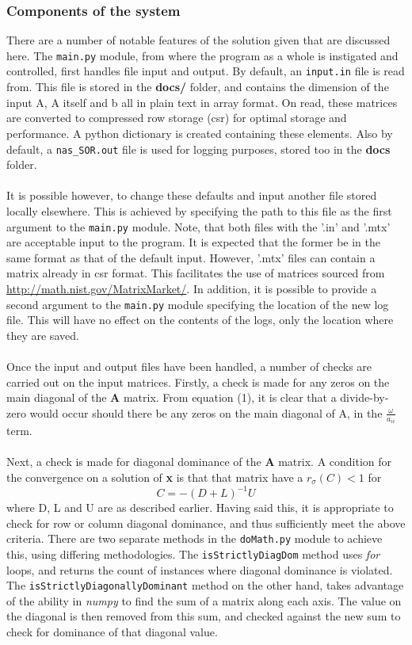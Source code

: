 \documentclass[paper=a4, fontsize=10pt]{article} %
\begin{document}
{\subsubsection{Components of the system}
{There are a number of notable features of the solution given that are discussed here. The \texttt{main.py} module, from where the program as a whole is instigated and controlled, first handles file input and output. By default, an \texttt{input.in} file is read from. This file is stored in the {\bf docs/} folder, and contains the dimension of the input A, A itself and b all in plain text in array format. On read, these matrices are converted to compressed row storage (csr) for optimal storage and performance. A python dictionary is created containing these elements. Also by default, a \texttt{nas\_SOR.out} file is used for logging purposes, stored too in the {\bf docs} folder. \\\\
It is possible however, to change these defaults and input another file stored locally elsewhere. This is achieved by specifying the path to this file as the first argument to the \texttt{main.py} module. Note, that both files with the '.in' and '.mtx' are acceptable input to the program. It is expected that the former be in the same format as that of the default input. However, '.mtx' files can contain a matrix already in csr format. This facilitates the use of matrices sourced from \url{http://math.nist.gov/MatrixMarket/}. In addition, it is possible to provide a second argument to the \texttt{main.py} module specifying the location of the new log file. This will have no effect on the contents of the logs, only the location where they are saved. \\\\
Once the input and output files have been handled, a number of checks are carried out on the input matrices. Firstly, a check is made for any zeros on the main diagonal of the {\bf A} matrix. From equation (1), it is clear that a divide-by-zero would occur should there be any zeros on the main diagonal of A, in the $\frac{\omega}{a_{ii}}$ term. \\\\
Next, a check is made for diagonal dominance of the {\bf A} matrix. A condition for the convergence on a solution of {\bf x} is that that matrix have a $r_\sigma (C) < 1$ for 
\begin{equation}
C = -(D + L)^{-1}U
\end{equation}
where D, L and U are as described earlier. Having said this, it is appropriate to check for row or column diagonal dominance, and thus sufficiently meet the above criteria. There are two separate methods in the \texttt{doMath.py} module to achieve this, using differing methodologies. The \texttt{isStrictlyDiagDom} method uses {\it for} loops, and returns the count of instances where diagonal dominance is violated. The \texttt{isStrictlyDiagonallyDominant} method on the other hand, takes advantage of the ability in {\it numpy} to find the sum of a matrix along each axis. The value on the diagonal is then removed from this sum, and checked against the new sum to check for dominance of that diagonal value.   


}}
\end{document}
